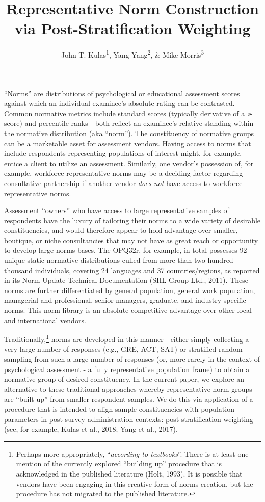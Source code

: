 \documentclass[
  ,man]{apa7}
\title{Representative Norm Construction via Post-Stratification Weighting}
\author{John T. Kulas\textsuperscript{1}, Yang Yang\textsuperscript{2}, \& Mike Morris\textsuperscript{3}}
\date{}
\affiliation{\vspace{0.5cm}\textsuperscript{1} Montclair State University\\\textsuperscript{2} China Select\\\textsuperscript{3} CPP Inc}
\begin{document}
\maketitle

``Norms'' are distributions of psychological or educational assessment scores against which an individual examinee's absolute rating can be contrasted. Common normative metrics include standard scores (typically derivative of a \emph{z}-score) and percentile ranks - both reflect an examinee's relative standing within the normative distribution (aka ``norm''). The constituency of normative groups can be a marketable asset for assessment vendors. Having access to norms that include respondents representing populations of interest might, for example, entice a client to utilize an assessment. Similarly, one vendor's possession of, for example, workforce representative norms may be a deciding factor regarding consultative partnership if another vendor \emph{does not} have access to workforce representative norms.

Assessment ``owners'' who have access to large representative samples of respondents have the luxury of tailoring their norms to a wide variety of desirable constituencies, and would therefore appear to hold advantage over smaller, boutique, or niche consultancies that may not have as great reach or opportunity to develop large norms bases. The OPQ32r, for example, in total possesses 92 unique static normative distributions culled from more than two-hundred thousand individuals, covering 24 languages and 37 countries/regions, as reported in its Norm Update Technical Documentation (SHL Group Ltd., 2011). These norms are further differentiated by general population, general work population, managerial and professional, senior managers, graduate, and industry specific norms. This norm library is an absolute competitive advantage over other local and international vendors.

Traditionally,\footnote{Perhaps more appropriately, ``\emph{according to textbooks}''. There is at least one mention of the currently explored ``building up'' procedure that is acknowledged in the published literature (Holt, 1993). It is possible that vendors have been engaging in this creative form of norms creation, but the procedure has not migrated to the published literature.} norms are developed in this manner - either simply collecting a very large number of responses (e.g., GRE, ACT, SAT) or stratified random sampling from such a large number of responses (or, more rarely in the context of psychological assessment - a fully representative population frame) to obtain a normative group of desired constituency. In the current paper, we explore an alternative to these traditional approaches whereby representative norm groups are ``built up'' from smaller respondent samples. We do this via application of a procedure that is intended to align sample constituencies with population parameters in post-survey administration contexts: post-stratification weighting (see, for example, Kulas et al., 2018; Yang et al., 2017).
\end{document}
